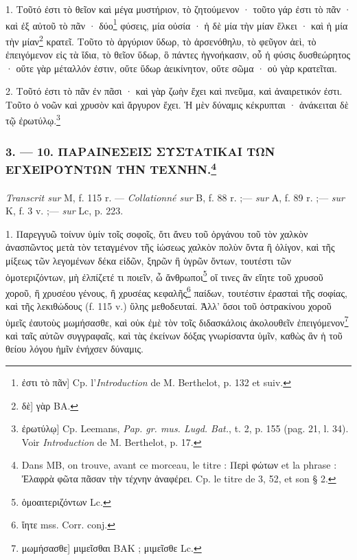 \documentclass[landscape, a4paper, 11pt, oneside, polutonikogreek, french]{article}
\begin{document}
\bigskip

1. Τοῦτό ἐστι τὸ θεῖον καὶ μέγα μυστήριον, τὸ ζητούμενον · τοῦτο γάρ ἐστι τὸ πᾶν · καὶ ἐξ αὐτοῦ τὸ πᾶν · δύο\footnote{ἐστι τὸ πᾶν] Cp. l'\emph{Introduction} de M. Berthelot, p. 132 et suiv.} φύσεις, μία οὐσία · ἡ δὲ μία τὴν μίαν ἕλκει · καὶ ἡ μία τὴν μίαν\footnote{δὲ] γὰρ BA.} κρατεῖ. Τοῦτο τὸ ἀργύριον ὕδωρ, τὸ ἀρσενόθηλυ, τὸ φεῦγον ἀεὶ, τὸ ἐπειγόμενον εἰς τὰ ἴδια, τὸ θεῖον ὕδωρ, ὃ πάντες ἠγνοήκασιν, οὗ ἡ φύσις δυσθεώρητος · οὔτε γὰρ μέταλλόν ἐστιν, οὔτε ὕδωρ ἀεικίνητον, οὔτε σῶμα · οὐ γὰρ κρατεῖται.

2. Τοῦτό ἐστι τὸ πᾶν ἐν πᾶσι · καὶ γὰρ ζωὴν ἔχει καὶ πνεῦμα, καὶ ἀναιρετικόν ἐστι. Τοῦτο ὁ νοῶν καὶ χρυσὸν καὶ ἄργυρον ἔχει. Ἡ μὲν δύναμις κέκρυπται · ἀνάκειται δὲ τῷ ἐρωτύλῳ.\footnote{ἐρωτύλῳ] Cp. Leemans, \emph{Pap. gr. mus. Lugd. Bat.}, t. 2, p. 155 (pag. 21, l. 34). Voir \emph{Introduction} de M. Berthelot, p. 17.}
\clearpage
\bigskip
\centerline{\EightStarTaper}
\centerline{\EightStarTaper\EightStarTaper}
\bigskip

\subsubsection[3. --- 10. ΠΑΡΑΙΝΕΣΕΙΣ ΣΥΣΤΑΤΙΚΑΙ ΤΩΝ ΕΓΧΕΙΡΟΥΝΤΩΝ ΤΗΝ ΤΕΧΝΗΝ.]{3. --- 10. ΠΑΡΑΙΝΕΣΕΙΣ ΣΥΣΤΑΤΙΚΑΙ ΤΩΝ ΕΓΧΕΙΡΟΥΝΤΩΝ ΤΗΝ ΤΕΧΝΗΝ.\footnote{Dans MB, on trouve, avant ce morceau, le titre : Περὶ φώτων et la phrase : Ἐλαφρὰ φῶτα πᾶσαν τὴν τέχνην ἀναφέρει. Cp. le titre de 3, 52, et son § 2.}}
\paragraph{}
\emph{Transcrit sur} M, f. 115 r. --- \emph{Collationné sur} B, f. 88 r. ;--- \emph{sur} A, f. 89 r. ;--- \emph{sur} K, f. 3 v. ;--- \emph{sur} Lc, p. 223.

\bigskip

1. Παρεγγυῶ τοίνυν ὑμίν τοῖς σοφοῖς, ὅτι ἄνευ τοῦ ὀργάνου τοῦ τὸν χαλκὸν ἀνασπῶντος μετὰ τὸν τεταγμένον τῆς ἰώσεως χαλκὸν πολὺν ὄντα ἢ ὀλίγον, καὶ τῆς μίξεως τῶν λεγομένων δέκα εἰδῶν, ξηρῶν ἢ ὑγρῶν ὅντων, τουτέστι τῶν ὁμοτεριζόντων, μὴ ἐλπίζετέ τι ποιεῖν, ὦ ἄνθρωποι\footnote{ὁμοαιτεριζόντων Lc.} οἵ τινες ἂν εἴητε τοῦ χρυσοῦ χοροῦ, ἢ χρυσέου γένους, ἢ χρυσέας κεφαλῆς\footnote{ἴητε mss. Corr. conj.} παίδων, τουτέστιν ἐρασταὶ τῆς σοφίας, καὶ τῆς λεκιθώδους (f. 115 v.) ὕλης μεθοδευταί. Ἀλλ' ὅσοι τοῦ ὀστρακίνου χοροῦ ὑμεῖς ἐαυτοὺς μωμήσασθε, καὶ οὐκ ἐμὲ τὸν τοῖς διδασκάλοις ἀκολουθεῖν ἐπειγόμενον\footnote{μωμήσασθε] μιμεῖσθαι BAK ; μιμεῖσθε Lc.} καὶ ταῖς αὐτῶν συγγραφαῖς, καὶ τὰς ἐκείνων δόξας γνωρίσαντα ὑμῖν, καθὼς ἂν ἡ τοῦ θείου λόγου ἡμῖν ἐνήχσεν δύναμις.
\end{document}
